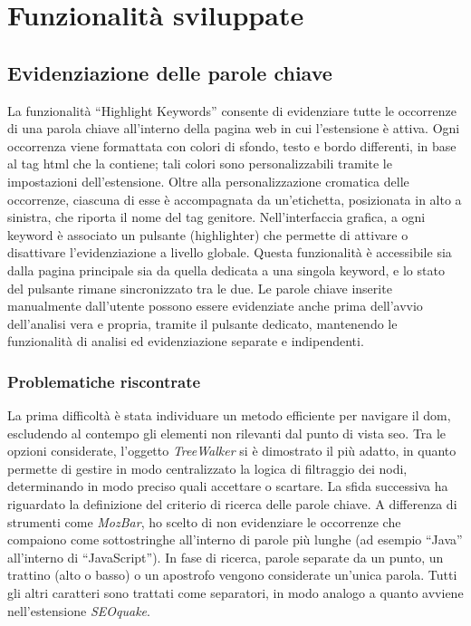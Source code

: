 \chapter{Funzionalità sviluppate}
\label{cap:funzionalità-sviluppate}

\section{Evidenziazione delle parole chiave}

\par La funzionalità “Highlight Keywords” consente di evidenziare tutte le occorrenze di una parola chiave all’interno della pagina web in cui l’estensione è attiva. Ogni occorrenza viene formattata con colori di sfondo, testo e bordo differenti, in base al tag \gls{html} che la contiene; tali colori sono personalizzabili tramite le impostazioni dell’estensione. Oltre alla personalizzazione cromatica delle occorrenze, ciascuna di esse è accompagnata da un’etichetta, posizionata in alto a sinistra, che riporta il nome del tag genitore. Nell’interfaccia grafica, a ogni keyword è associato un pulsante (highlighter) che permette di attivare o disattivare l’evidenziazione a livello globale. Questa funzionalità è accessibile sia dalla pagina principale sia da quella dedicata a una singola keyword, e lo stato del pulsante rimane sincronizzato tra le due. Le parole chiave inserite manualmente dall'utente possono essere evidenziate anche prima dell’avvio dell’analisi vera e propria, tramite il pulsante dedicato, mantenendo le funzionalità di analisi ed evidenziazione separate e indipendenti.

\subsection{Problematiche riscontrate}

\par La prima difficoltà è stata individuare un metodo efficiente per navigare il \gls{dom}, escludendo al contempo gli elementi non rilevanti dal punto di vista \gls{seo}. Tra le opzioni considerate, l’oggetto \textit{TreeWalker} si è dimostrato il più adatto, in quanto permette di gestire in modo centralizzato la logica di filtraggio dei nodi, determinando in modo preciso quali accettare o scartare. La sfida successiva ha riguardato la definizione del criterio di ricerca delle parole chiave. A differenza di strumenti come \textit{MozBar}, ho scelto di non evidenziare le occorrenze che compaiono come sottostringhe all’interno di parole più lunghe (ad esempio “Java” all’interno di “JavaScript”). In fase di ricerca, parole separate da un punto, un trattino (alto o basso) o un apostrofo vengono considerate un’unica parola. Tutti gli altri caratteri sono trattati come separatori, in modo analogo a quanto avviene nell’estensione \textit{SEOquake}.

